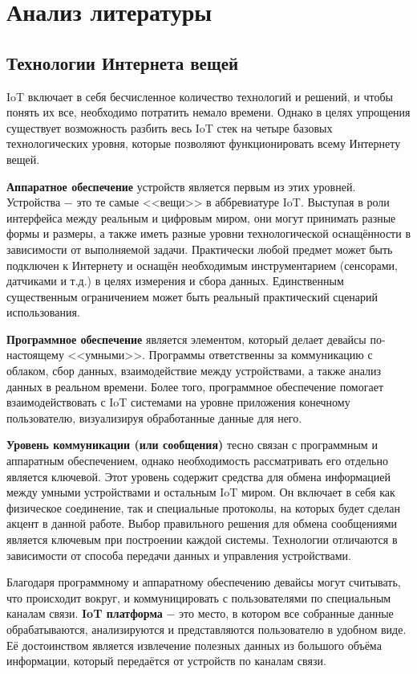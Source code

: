 \chapter{Анализ литературы}


	\setcounter{subsection}{-1}
	\section{Технологии Интернета вещей}
	IoT включает в себя бесчисленное количество технологий и решений, и чтобы понять их все, необходимо
	потратить немало времени. Однако в целях упрощения существует возможность разбить весь IoT стек на
	четыре базовых технологических уровня, которые позволяют функционировать всему Интернету вещей.
	
	\textbf{Аппаратное обеспечение} устройств является первым из этих уровней. Устройства $-$ это те самые
	<<вещи>> в аббревиатуре IoT. Выступая в роли интерфейса между реальным и цифровым миром, они
	могут принимать разные формы и размеры, а также иметь разные уровни технологической оснащённости в
	зависимости от выполняемой задачи. Практически любой предмет может быть подключен к Интернету и
	оснащён необходимым инструментарием (сенсорами, датчиками и т.д.) в целях измерения и сбора данных.
	Единственным существенным ограничением может быть реальный практический сценарий использования.
	
	\textbf{Программное обеспечение} является элементом, который делает девайсы по-настоящему <<умными>>.
	Программы ответственны за коммуникацию с облаком, сбор данных, взаимодействие между устройствами,
	а также анализ данных в реальном времени. Более того, программное обеспечение помогает взаимодействовать
	с IoT системами на уровне приложения конечному пользователю, визуализируя обработанные данные для него.
	
	\textbf{Уровень коммуникации (или сообщения)} тесно связан с программным и аппаратным обеспечением, однако
	необходимость рассматривать его отдельно является ключевой. Этот уровень содержит средства для обмена
	информацией между умными устройствами и остальным IoT миром. Он включает в себя как физическое соединение,
	так и специальные протоколы, на которых будет сделан акцент в данной работе. Выбор правильного решения
	для обмена сообщениями является ключевым при построении каждой системы. Технологии отличаются в
	зависимости от способа передачи данных и управления устройствами.
	
	Благодаря программному и аппаратному обеспечению девайсы могут считывать, что происходит вокруг, и
	коммуницировать с пользователями по специальным каналам связи. \textbf{IoT платформа} $-$ это место, в котором
	все собранные данные обрабатываются, анализируются и представляются пользователю в удобном виде.
	Её достоинством является извлечение полезных данных из большого объёма информации, который передаётся
	от устройств по каналам связи.
	
